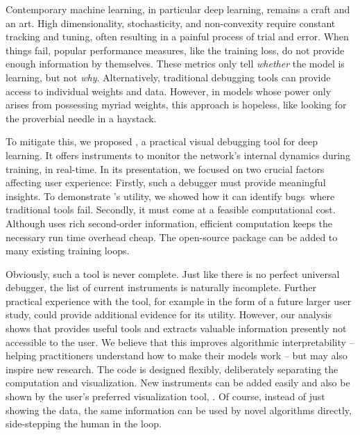Contemporary machine learning, in particular deep learning, remains a craft and
an art. High dimensionality, stochasticity, and non-convexity require constant
tracking and tuning, often resulting in a painful process of trial and error.
When things fail, popular performance measures, like the training loss, do not
provide enough information by themselves. These metrics only tell \emph{whether}
the model is learning, but not \emph{why}. Alternatively, traditional debugging
tools can provide access to individual weights and data. However, in models
whose power only arises from possessing myriad weights, this approach is
hopeless, like looking for the proverbial needle in a haystack.

To mitigate this, we proposed \cockpit, a practical visual debugging tool for
deep learning. It offers instruments to monitor the network's internal dynamics
during training, in real-time. In its presentation, we focused on two crucial
factors affecting user experience: Firstly, such a debugger must provide
meaningful insights. To demonstrate \cockpit's utility, we showed how it can
identify bugs where traditional tools fail. Secondly, it must come at a feasible
computational cost. Although \cockpit uses rich second-order information,
efficient computation keeps the necessary run time overhead cheap. The
open-source \pytorch package can be added to many existing training loops.

Obviously, such a tool is never complete. Just like there is no perfect
universal debugger, the list of current instruments is naturally incomplete.
Further practical experience with the tool, for example in the form of a future
larger user study, could provide additional evidence for its utility. However,
our analysis shows that \cockpit provides useful tools and extracts valuable
information presently not accessible to the user. We believe that this improves
algorithmic interpretability -- helping practitioners understand how to make
their models work -- but may also inspire new research. The code is designed
flexibly, deliberately separating the computation and visualization. New
instruments can be added easily and also be shown by the user's preferred
visualization tool, \eg \tensorboard. Of course, instead of just showing the
data, the same information can be used by novel algorithms directly,
side-stepping the human in the loop.

